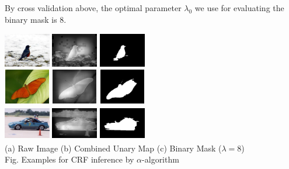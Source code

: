 \documentclass[10pt,twocolumn,letterpaper]{article}
\begin{document}
By cross validation above, the optimal parameter $\lambda_0$ we use for evaluating the binary mask is 8.
\begin{center}
    \includegraphics[width=0.8in,height=0.6in]{./Figures/CRFinference/5_159_159364.jpg}
    \includegraphics[width=0.8in,height=0.6in]{./Figures/CRFinference/5_159_159364_3.jpg}
    \includegraphics[width=0.8in,height=0.6in]{./Figures/CRFinference/5_159_159364_2.jpg} \\
    \includegraphics[width=0.8in,height=0.6in]{./Figures/CRFinference/5_159_159649.jpg}
    \includegraphics[width=0.8in,height=0.6in]{./Figures/CRFinference/5_159_159649_3.jpg}
    \includegraphics[width=0.8in,height=0.6in]{./Figures/CRFinference/5_159_159649_2.jpg} \\
    \includegraphics[width=0.8in,height=0.6in]{./Figures/CRFinference/5_162_162349.jpg}
    \includegraphics[width=0.8in,height=0.6in]{./Figures/CRFinference/5_162_162349_3.jpg}
    \includegraphics[width=0.8in,height=0.6in]{./Figures/CRFinference/5_162_162349_2.jpg} \\
    \footnotesize  (a) Raw Image (b) Combined Unary Map  (c) Binary Mask ($\lambda=8$)\\
     Fig. Examples for CRF inference by $\alpha$-algorithm
\end{center}
\end{document}
